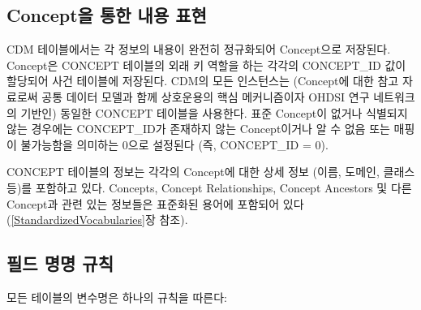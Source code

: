 \documentclass[11pt]{book}
\theoremstyle{definition}
\theoremstyle{definition}
\theoremstyle{definition}
\theoremstyle{remark}
\begin{document}
\subsection{Concept을 통한 내용 표현}\label{concept---}

CDM 테이블에서는 각 정보의 내용이 완전히 정규화되어 Concept으로
저장된다. Concept은 CONCEPT 테이블의 외래 키 역할을 하는 각각의
CONCEPT\_ID 값이 할당되어 사건 테이블에 저장된다. CDM의 모든 인스턴스는
(Concept에 대한 참고 자료로써 공통 데이터 모델과 함께 상호운용의 핵심
메커니즘이자 OHDSI 연구 네트워크의 기반인) 동일한 CONCEPT 테이블을
사용한다. 표준 Concept이 없거나 식별되지 않는 경우에는 CONCEPT\_ID가
존재하지 않는 Concept이거나 알 수 없음 또는 매핑이 불가능함을 의미하는
0으로 설정된다 (즉, CONCEPT\_ID = 0).

CONCEPT 테이블의 정보는 각각의 Concept에 대한 상세 정보 (이름, 도메인,
클래스 등)를 포함하고 있다. Concepts, Concept Relationships, Concept
Ancestors 및 다른 Concept과 관련 있는 정보들은 표준화된 용어에 포함되어
있다 (\ref{StandardizedVocabularies}장 참조).

\subsection{필드 명명 규칙}\label{--}

모든 테이블의 변수명은 하나의 규칙을 따른다:
\end{document}
